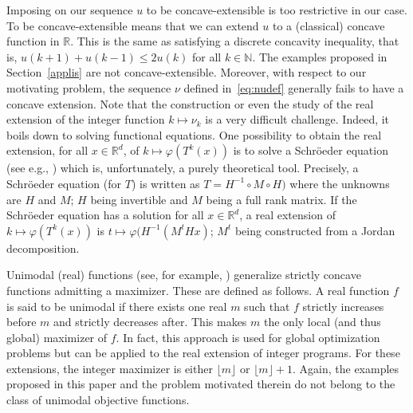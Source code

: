 \documentclass{article}
\def\rr{\mathbb R}
\def\rd{\rr^d}
\def\nn{\mathbb N}
\def\blue#1{#1}
\begin{document}
\blue{
	Imposing on our sequence $u$ to be concave-extensible is too restrictive in our case. To be concave-extensible means that we can extend $u$ to a (classical) concave function in $\rr$. This is the same as satisfying a discrete concavity inequality, that is, $u(k+1)+u(k-1)\leq 2u(k)$ for all $k\in\nn$. The examples proposed in Section~\ref{applis} are not concave-extensible. Moreover, with respect to our motivating problem, the sequence $\nu$ defined in~\eqref{eq:nudef} generally fails to have a concave extension. Note that the construction or even the study of the real extension of the integer function $k\mapsto \nu_k$ is a very difficult challenge. Indeed, it boils down to solving functional equations. One possibility to obtain the real extension, for all $x\in\rd$, of $k\mapsto \varphi(T^k(x))$ is to solve a  Schröeder equation (see e.g., \cite{10.11650/twjm/1500407524}) which is, unfortunately, a purely theoretical tool. Precisely, a Schröeder equation (for $T$) is written as $T=H^{-1}\circ M \circ H)$ where the unknowns are $H$ and $M$; $H$ being invertible and $M$ being a full rank matrix. If the Schröeder equation has a solution for all $x\in\rd$, a real extension of $k\mapsto \varphi(T^k(x))$ is $t\mapsto \varphi(H^{-1}(M^t Hx)$; $M^t$ being constructed from a Jordan decomposition. 
}

\blue{
Unimodal (real) functions (see, for example, \cite{HASSIN2018795}) generalize strictly concave functions admitting a maximizer. These are defined as follows. A real function $f$ is said to be unimodal if there exists one real $m$ such that $f$ strictly increases before $m$ and strictly decreases after. This makes $m$ the only local (and thus global) maximizer of $f$. In fact, this approach is used for global optimization problems but can be applied to the real extension of integer programs. For these extensions, the integer maximizer is either $\lfloor m\rfloor$ or $\lfloor m\rfloor+1$. Again, the examples proposed in this paper and the problem motivated therein do not belong to the class of unimodal objective functions.  
}
\end{document}
